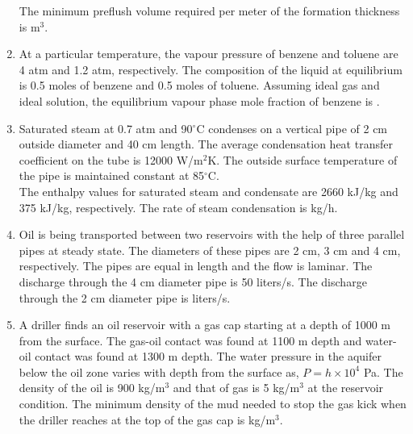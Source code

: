 \documentclass[journal,12pt,onecolumn]{IEEEtran}
\theoremstyle{remark}
\begin{document}
\begin{enumerate}
The minimum preflush volume required per meter of the formation thickness is \underline{\hspace{2cm}} m$^3$.  

\hfill{}

\item At a particular temperature, the vapour pressure of benzene and toluene are 4 atm and 1.2 atm, respectively. The composition of the liquid at equilibrium is 0.5 moles of benzene and 0.5 moles of toluene. Assuming ideal gas and ideal solution, the equilibrium vapour phase mole fraction of benzene is \underline{\hspace{2cm}}.  

\hfill{}

\item Saturated steam at 0.7 atm and 90$^\circ$C condenses on a vertical pipe of 2 cm outside diameter and 40 cm length. The average condensation heat transfer coefficient on the tube is 12000 W/m$^2$K. The outside surface temperature of the pipe is maintained constant at 85$^\circ$C. \\ 
The enthalpy values for saturated steam and condensate are 2660 kJ/kg and 375 kJ/kg, respectively. The rate of steam condensation is \underline{\hspace{2cm}} kg/h.\\

\hfill{}

\item Oil is being transported between two reservoirs with the help of three parallel pipes at steady state. The diameters of these pipes are 2 cm, 3 cm and 4 cm, respectively. The pipes are equal in length and the flow is laminar. The discharge through the 4 cm diameter pipe is 50 liters/s. The discharge through the 2 cm diameter pipe is \underline{\hspace{2cm}} liters/s.  

\hfill{}

\pagebreak

\item A driller finds an oil reservoir with a gas cap starting at a depth of 1000 m from the surface. The gas-oil contact was found at 1100 m depth and water-oil contact was found at 1300 m depth. The water pressure in the aquifer below the oil zone varies with depth from the surface  as, $P = h \times 10^4$ Pa. The density of the oil is 900 kg/m$^3$ and that of gas is 5 kg/m$^3$ at the reservoir condition. The minimum density of the mud needed to stop the gas kick when the driller reaches at the top of the gas cap is \underline{\hspace{2cm}} kg/m$^3$.  


\end{enumerate}
\end{document}
